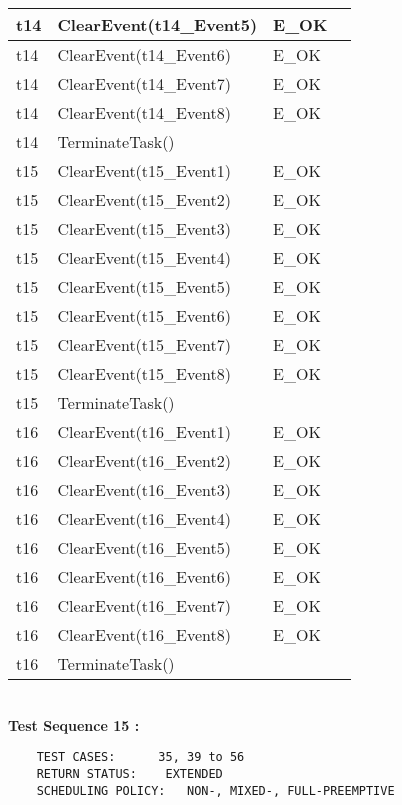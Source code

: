 \documentclass[10pt]{article}
\newlength{\Li}\settowidth{\Li}{Running}
\newlength{\Lii}\setlength{\Lii}{7cm}
\newlength{\Liiii}\setlength{\Liiii}{0.9cm}
\newlength{\Liii}\setlength{\Liii}{\textwidth} \addtolength{\Liii}{-\Li} \addtolength{\Liii}{-\Lii} \addtolength{\Liii}{-\Liiii}
\begin{document}
\begin{supertabular}{|p{\Li}|p{\Lii}|p{\Liii}|p{\Liiii}|}
	t14	& ClearEvent(t14\_Event5)		& E\_OK				& \\ \hline 
	t14	& ClearEvent(t14\_Event6)		& E\_OK				& \\ \hline 
	t14	& ClearEvent(t14\_Event7)		& E\_OK				& \\ \hline 
	t14	& ClearEvent(t14\_Event8)		& E\_OK				& \\ \hline 
	t14	& TerminateTask()				&					&  \\ \hline
	t15	& ClearEvent(t15\_Event1)		& E\_OK				& \\ \hline 
	t15	& ClearEvent(t15\_Event2)		& E\_OK				& \\ \hline 
	t15	& ClearEvent(t15\_Event3)		& E\_OK				& \\ \hline 
	t15	& ClearEvent(t15\_Event4)		& E\_OK				& \\ \hline 
	t15	& ClearEvent(t15\_Event5)		& E\_OK				& \\ \hline 
	t15	& ClearEvent(t15\_Event6)		& E\_OK				& \\ \hline 
	t15	& ClearEvent(t15\_Event7)		& E\_OK				& \\ \hline 
	t15	& ClearEvent(t15\_Event8)		& E\_OK				& \\ \hline 
	t15	& TerminateTask()				&					&  \\ \hline
	t16	& ClearEvent(t16\_Event1)		& E\_OK				& \\ \hline 
	t16	& ClearEvent(t16\_Event2)		& E\_OK				& \\ \hline 
	t16	& ClearEvent(t16\_Event3)		& E\_OK				& \\ \hline 
	t16	& ClearEvent(t16\_Event4)		& E\_OK				& \\ \hline 
	t16	& ClearEvent(t16\_Event5)		& E\_OK				& \\ \hline 
	t16	& ClearEvent(t16\_Event6)		& E\_OK				& \\ \hline 
	t16	& ClearEvent(t16\_Event7)		& E\_OK				& \\ \hline 
	t16	& ClearEvent(t16\_Event8)		& E\_OK				& \\ \hline 
	t16	& TerminateTask()				&					&  \\ \hline
	
	\end{supertabular} \\
	
	\textbf{Test Sequence 15 :}
	\begin{lstlisting}
	TEST CASES:		 35, 39 to 56
	RETURN STATUS:	  EXTENDED
	SCHEDULING POLICY:   NON-, MIXED-, FULL-PREEMPTIVE
	\end{lstlisting}
	
\end{document}
